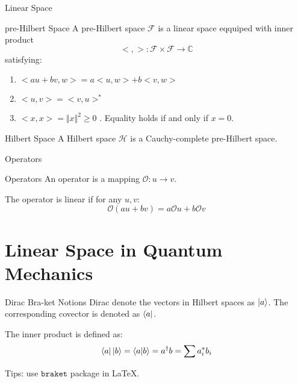 \documentclass[aspectratio=169,10pt,compress,t]{ctexbeamer}
\begin{document}
\begin{frame}{Linear Space}

\begin{block}{pre-Hilbert Space}
    A pre-Hilbert space $\mathcal{F}$ is a linear space eqquiped with inner product 
    $$< , >: \mathcal{F} × \mathcal{F} → \mathbb{C}$$
    satisfying:
    \begin{enumerate}
      \item $<au+bv, w> = a<u,w>+ b<v,w>$
      \item $<u, v> = <v, u>^*$
      \item $<x, x> = \Vert x \Vert^2 \geq 0 $ . Equality holds if and only if $x = 0$.
    \end{enumerate}
\end{block}  

\begin{block}{Hilbert Space}
  A Hilbert space $\mathcal{H}$ is a Cauchy-complete pre-Hilbert space.
\end{block}  
\end{frame}

\begin{frame}{Operators}
\begin{block}{Operators}
  An operator is a mapping $\mathscr{O}: u → v$.
  
  The operator is linear if for any $u, v$:
  $$\mathscr{O}(au+bv)=a\mathscr{O}u+b\mathscr{O}v$$
\end{block}  

\end{frame}

\section{Linear Space in Quantum Mechanics}
\begin{frame}{Dirac Bra-ket Notions}
Dirac denote the vectors in Hilbert spaces as $\ket{a}$.
The corresponding covector is denoted as $\bra{a}$.

The inner product is defined as:
$$\bra{a} \ket{b} = \braket{a|b} = a^\dagger b = \sum a_i^* b_i$$

Tips: use $\mathtt{braket}$ package in \LaTeX.

\bigskip

\end{frame}
\end{document}
